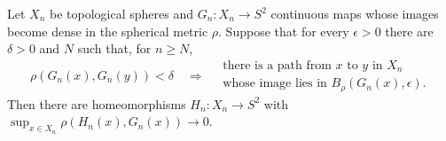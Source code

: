 \begin{lemma}
\label{cut:homeomorphism-promotion}
Let $X_n$ be topological spheres and $G_n:X_n\to S^2$ continuous maps whose
images become dense in the spherical metric $\rho$.  Suppose that for every
$\epsilon>0$ there are $\delta>0$ and $N$ such that, for $n\geq N$,
\begin{equation}\label{cut:uniform-lifts}
 \rho(G_n(x),G_n(y))<\delta
 \quad\Longrightarrow\quad
 \begin{gathered}
 \text{there is a path from $x$ to $y$ in $X_n$}\\[-2pt]
 \text{whose image lies in $B_\rho(G_n(x),\epsilon)$.}
 \end{gathered}
\end{equation}
Then there are homeomorphisms $H_n:X_n\to S^2$ with
$\sup_{x\in X_n}\rho(H_n(x),G_n(x))\to0$.
\end{lemma}
